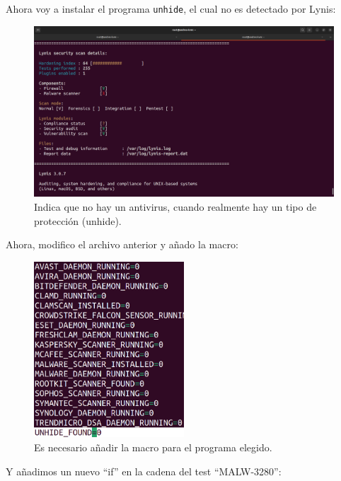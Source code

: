 \documentclass{article}
\begin{document}
\bigskip

Ahora voy a instalar el programa \verb|unhide|, el cual no es detectado por Lynis:

\begin{figure}[H]
    \includegraphics[width=\textwidth]{imagenes/lynisresults3unhide.png}
    \caption{Indica que no hay un antivirus, cuando realmente hay un tipo de protección (unhide).}
\end{figure}

\newpage

Ahora, modifico el archivo anterior y añado la macro:

\begin{figure}[H]
    \centering
    \includegraphics[width=0.5\textwidth]{imagenes/macro.png}
    \caption{Es necesario añadir la macro para el programa elegido.}
\end{figure}

\bigskip

Y añadimos un nuevo ``if'' en la cadena del test ``MALW-3280'':
\end{document}
